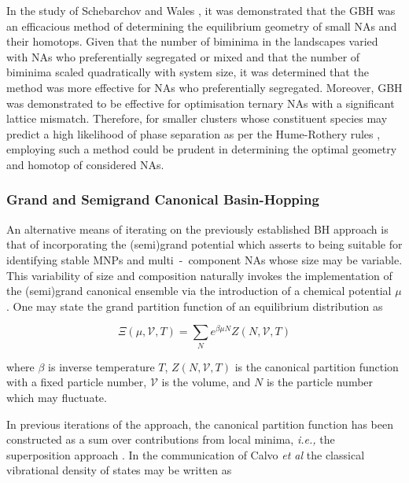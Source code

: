 In the study of Schebarchov and Wales \cite{C5CP01198A}, it was demonstrated that the GBH was an efficacious method of determining the equilibrium geometry of small NAs and their homotops. Given that the number of biminima in the landscapes varied with NAs who preferentially segregated or mixed and that the number of biminima scaled quadratically with system size, it was determined that the method was more effective for NAs who preferentially segregated. Moreover, GBH was demonstrated to be effective for optimisation ternary NAs with a significant lattice mismatch. Therefore, for smaller clusters whose constituent species may predict a high likelihood of phase separation as per the Hume-Rothery rules \cite{Hume_Rothery_Rule1,Hume_Rothery_Rule2,Hume_Rothery_Rule3,Hume_Rothery_Rule4}, employing such a method could be prudent in determining the optimal geometry and homotop of considered NAs.

\subsubsection{Grand and Semigrand Canonical Basin-Hopping}
\label{sec:sg_bh}

An alternative means of iterating on the previously established BH approach \cite{Wales1999-dv} is that of incorporating the (semi)grand potential which asserts to being suitable for identifying stable MNPs and multi~-~component NAs whose size may be variable. This variability of size and composition naturally invokes the implementation of the (semi)grand canonical ensemble via the introduction of a chemical potential $\mu$. One may state the grand partition function of an equilibrium distribution as 

\begin{equation}
    \Xi\left(\mu,\mathcal{V}, T\right) = \sum_{N} e^{\beta \mu N}Z\left( N,\mathcal{V}, T\right)
    \label{eqn:gpf}
\end{equation}

where $\beta$ is inverse temperature $T$, $Z\left( N,\mathcal{V}, T\right)$ is the canonical partition function with a fixed particle number, $\mathcal{V}$ is the volume, and $N$ is the particle number which may fluctuate.

In previous iterations of the approach, the canonical partition function has been constructed as a sum over contributions from local minima, \textit{i.e.,} the superposition approach \cite{STRODEL2008105,doi:10.1080/00268979300100141,doi:10.1126/science.225.4666.983}. In the communication of Calvo \textit{et al} \cite{doi:10.1021/acs.jctc.5b00962} the classical vibrational density of states may be written as 

